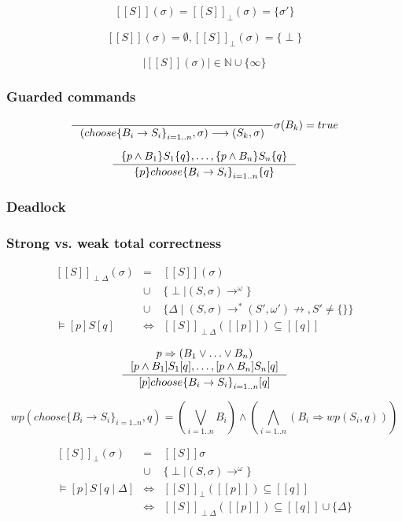 \documentclass[12pt, a4paper]{book}
\begin{document}
  $$
    [[S]](\sigma) = {[[S]]}_{\perp}(\sigma) = \{\sigma'\}
  $$

  $$
    [[S]](\sigma) = \emptyset, {[[S]]}_{\perp}(\sigma) = \{\perp\}
  $$

  $$
    \mid [[S]](\sigma) \mid \in \mathbb{N} \cup \{\infty\}
  $$

  \subsubsection{Guarded commands}
  \label{subs:Guarded commands}

  

  $$
  \inference{}
  {(choose {\{B_i \rightarrow S_i \}}_{i=1..n}, \sigma) \longrightarrow (S_k,\sigma)}
  \sigma(B_k)=true
  $$

  $$
  \inference{\{ p \land B_1 \} S_1 \{q\}, \ldots, \{p \land B_n \} S_n \{q\}}
  {\{p\} choose {\{B_i \rightarrow S_i \}}_{i=1..n} \{q\}}
  $$

  \subsubsection{Deadlock}
  \label{subs:Deadlock}
  \subsubsection{Strong vs. weak total correctness}
  \label{subs:Strong vs. weak total correctness}

  \begin{eqnarray*}
      {[[S]]}_{\perp \Delta}(\sigma) & = & [[S]](\sigma) \\
      & \cup & \{\perp \mid (S,\sigma) {\rightarrow}^{\omega} \} \\
      & \cup & \{\Delta \mid (S,\sigma) {\rightarrow}^{*} (S',\omega') \not\rightarrow, S' \neq \{\} \} \\
      \vDash [p] S [q] & \iff & {[[S]]}_{\perp \Delta}([[p]]) \subseteq [[q]]
  \end{eqnarray*}

  $$
  \inference{
    p \Rightarrow (B_1 \lor \ldots \lor B_n) \\
    [p \land B_1] S_1 [q], \ldots, [p \land B_n] S_n [q]
  }
  {[p] choose {\{B_i \rightarrow S_i\}}_{i=1..n} [q]}
  $$

  $$
  wp(choose{\{B_i \rightarrow S_i\}}_{i=1..n}, q) = ({\bigvee}_{i=1..n} B_i) \land ({\bigwedge}_{i=1..n} (B_i \Rightarrow wp(S_i, q)))
  $$

  \begin{eqnarray*}
      {[[S]]}_{\perp}(\sigma) & = & [[S]]{\sigma} \\
      & \cup & \{\perp \mid (S,\sigma) \rightarrow^{\omega}\} \\
      \vDash [p] S [q\mid\Delta] & \iff & [[S]]_{\perp}([[p]]) \subseteq [[q]] \\
      & \iff & {[[S]]}_{\perp \Delta}([[p]]) \subseteq [[q]] \cup \{\Delta\}
  \end{eqnarray*}
\end{document}
